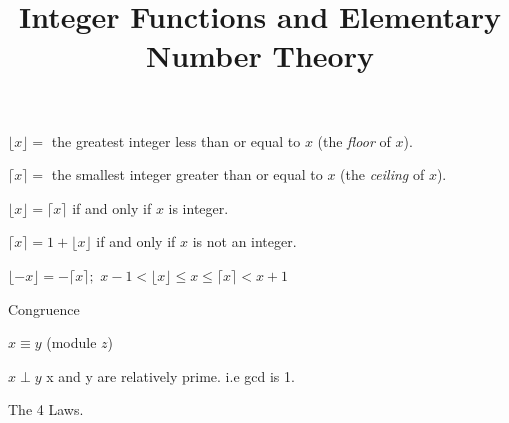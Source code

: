 \documentclass[12pt]{article}
\title{Integer Functions and Elementary Number Theory}
\begin{document}
\maketitle
  
$\lfloor x \rfloor = $ the greatest integer less than or equal to $x$ (the {\sl floor} of $x$).


$\lceil x \rceil = $ the smallest integer greater than or equal to $x$ (the {\sl ceiling} of $x$).


$\lfloor x \rfloor = \lceil x \rceil $ if and only if $x$ is integer.

$\lceil x \rceil  = 1 + \lfloor x \rfloor$ if and only if $x$ is not an integer.

$\lfloor -x \rfloor =  -\lceil x \rceil;$              $x-1 < \lfloor x \rfloor \le x \le \lceil x\rceil < x + 1$


Congruence

$x \equiv y $ (module $z$)

$x \perp y$ x and y are relatively prime. i.e gcd is 1.

The 4 Laws.




  
\end{document}
